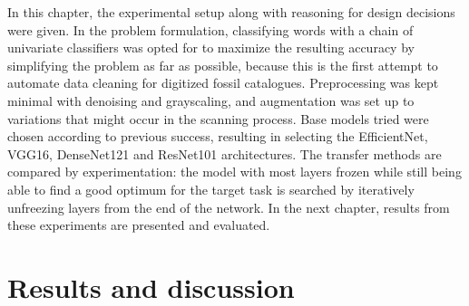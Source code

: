 \documentclass{article}
\begin{document}
In this chapter, the experimental setup along with reasoning for design decisions were given.
In the problem formulation, classifying words with a chain of univariate classifiers was opted for to 
maximize the resulting accuracy by simplifying the problem as far as possible, because this is the first attempt to 
automate data cleaning for digitized fossil catalogues. Preprocessing was kept minimal with denoising and grayscaling, 
and augmentation was set up to variations that might occur in the scanning process. Base models tried were 
chosen according to previous success, resulting in selecting the EfficientNet, VGG16, DenseNet121 and ResNet101 architectures.
The transfer methods are compared by experimentation: the model with most layers frozen while still being able to find a good optimum 
for the target task is searched by iteratively unfreezing layers from the end of the network. In the next chapter, 
results from these experiments are presented and evaluated.

\section{Results and discussion}
\end{document}
